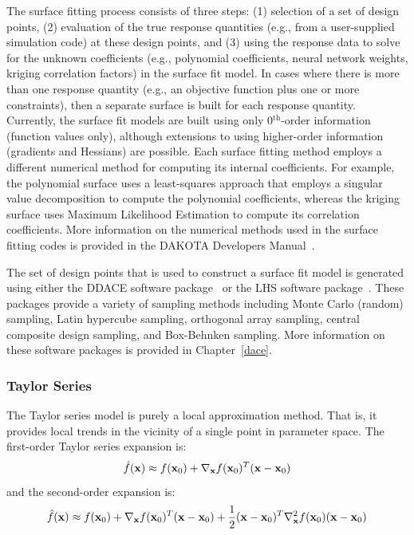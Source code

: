 The surface fitting process consists of three steps: (1) selection of
a set of design points, (2) evaluation of the true response quantities
(e.g., from a user-supplied simulation code) at these design points,
and (3) using the response data to solve for the unknown coefficients
(e.g., polynomial coefficients, neural network weights, kriging
correlation factors) in the surface fit model. In cases where there is
more than one response quantity (e.g., an objective function plus one
or more constraints), then a separate surface is built for each
response quantity. Currently, the surface fit models are built using
only 0$^{\mathrm{th}}$-order information (function values only), although
extensions to using higher-order information (gradients and Hessians)
are possible. Each surface fitting method employs a different
numerical method for computing its internal coefficients. For example,
the polynomial surface uses a least-squares approach that employs a
singular value decomposition to compute the polynomial coefficients,
whereas the kriging surface uses Maximum Likelihood Estimation to
compute its correlation coefficients. More information on the
numerical methods used in the surface fitting codes is provided in the
DAKOTA Developers Manual~\cite{DevMan}.

The set of design points that is used to construct a surface fit model
is generated using either the DDACE software package~\cite{TonXX} or the
LHS software package~\cite{Ima84}. These packages provide a variety of
sampling methods including Monte Carlo (random) sampling, Latin
hypercube sampling, orthogonal array sampling, central composite
design sampling, and Box-Behnken sampling. More information on these
software packages is provided in Chapter~\ref{dace}.

\subsubsection{Taylor Series}\label{models:surf:taylor}

The Taylor series model is purely a local approximation method. That
is, it provides local trends in the vicinity of a single point in
parameter space. The first-order Taylor series expansion is:
\begin{equation}
\hat{f}({\bf x}) \approx f({\bf x}_0) + \nabla_{\bf x} f({\bf x}_0)^T 
({\bf x} - {\bf x}_0) \label{eq:taylor1}
\end{equation}
and the second-order expansion is:
\begin{equation}
\hat{f}({\bf x}) \approx f({\bf x}_0) + \nabla_{\bf x} f({\bf x}_0)^T 
({\bf x} - {\bf x}_0) + \frac{1}{2} ({\bf x} - {\bf x}_0)^T 
\nabla^2_{\bf x} f({\bf x}_0) ({\bf x} - {\bf x}_0) \label{eq:taylor2}
\end{equation}

